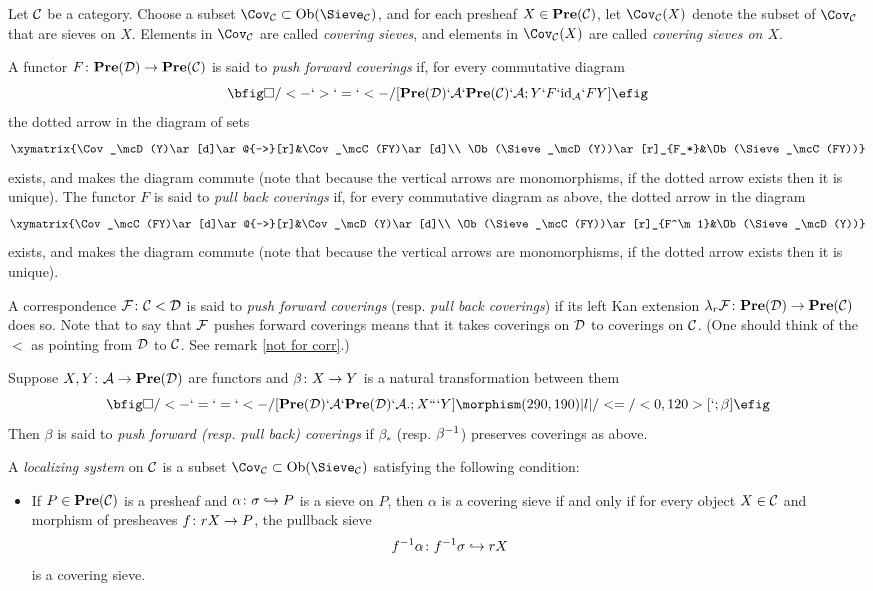 \documentclass[10pt]{amsart}
\begin{document}
\begin{definition}

Let $\mathcal{C}$ be a category.  Choose a subset $\Cov_\mcC\ss\Ob(\Sieve_\mcC)$, and for each presheaf $X\in{\bf Pre}(\mathcal{C})$, let
$\Cov_\mcC(X)$ denote the subset of $\Cov_\mcC$ that are sieves on $X$.  Elements in $\Cov_\mcC$ are called {\em covering sieves}, and elements in $\Cov_\mcC(X)$ are called {\em covering sieves on $X$}.

A functor $F\colon{\bf Pre}(\mathcal{D})\rightarrow{\bf Pre}(\mathcal{C})$ is said to {\em push forward coverings} if, for every commutative diagram $$\bfig
\square/<-`>`=`<-/[\Pre(\mcD)`\mcA`\Pre(\mcC)`\mcA;Y`F`\id_\mcA`FY] \efig$$ the dotted arrow in the diagram of sets $$\xymatrix{\Cov_\mcD(Y)\ar[d]\ar@{-->}[r]&\Cov_\mcC(FY)\ar[d]\\
\Ob(\Sieve_\mcD(Y))\ar[r]_{F_*}&\Ob(\Sieve_\mcC(FY))}$$ exists, and makes the diagram commute (note that because the vertical arrows are
monomorphisms, if the dotted arrow exists then it is unique).  The functor $F$ is said to {\em pull back coverings} if, for every commutative diagram as above, the dotted arrow in the diagram $$\xymatrix{\Cov_\mcC(FY)\ar[d]\ar@{-->}[r]&\Cov_\mcD(Y)\ar[d]\\
\Ob(\Sieve_\mcC(FY))\ar[r]_{F^\m1}&\Ob(\Sieve_\mcD(Y))}$$ exists, and makes the diagram commute (note that because the vertical arrows are
monomorphisms, if the dotted arrow exists then it is unique).

A correspondence $\mathcal{F}\colon\mathcal{C}<\mathcal{D}$ is said to {\em push forward coverings} (resp. {\em pull back coverings}) if its left Kan extension $\lambda_r\mathcal{F}\colon{\bf Pre}(\mathcal{D})\rightarrow{\bf Pre}(\mathcal{C})$ does so.  Note that to say that $\mathcal{F}$ pushes forward coverings means that it takes coverings on $\mathcal{D}$ to coverings on $\mathcal{C}$. (One should think of the $<$ as pointing from $\mathcal{D}$ to $\mathcal{C}$.  See remark \ref{not for corr}.)

Suppose $X,Y\colon\mathcal{A}\rightarrow{\bf Pre}(\mathcal{D})$ are functors and $\beta\colon X\rightarrow Y$ is a natural transformation between them $$\bfig
\square/<-`=`=`<-/[\Pre(\mcD)`\mcA`\Pre(\mcD)`\mcA.;X```Y] \morphism(290,190)|l|/<=/<0,120>[`;\beta] \efig$$  Then $\beta$ is said to {\em push forward (resp. pull back) coverings} if $\beta_*$ (resp. $\beta^\m1$) preserves coverings as above.

A {\em localizing system} on $\mathcal{C}$ is a subset $\Cov_\mcC\ss\Ob(\Sieve_\mcC)$ satisfying the following condition:  \begin{itemize} \item If $P\in{\bf Pre}(\mathcal{C})$ is a presheaf and $\alpha\colon\sigma\hookrightarrow P$ is a sieve on $P$, then $\alpha$ is a covering sieve if and only if for every object $X\in\mathcal{C}$ and morphism of presheaves $f\colon rX\rightarrow P$, the pullback sieve $$f^\m1\alpha\taking f^\m1\sigma\inj rX$$ is a covering sieve.\end{itemize} 


\end{definition}
\end{document}
